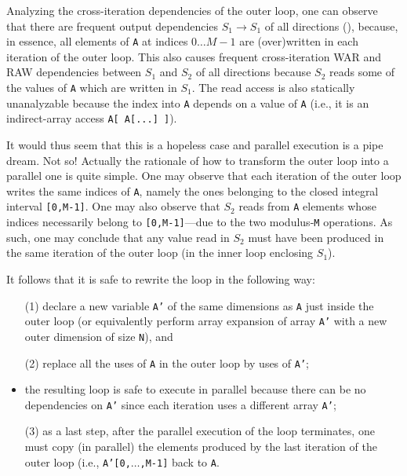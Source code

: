 \documentclass[acmsmall,review]{acmart}\settopmatter{printfolios=true,printccs=false,printacmref=false}
\begin{document}
Analyzing the cross-iteration dependencies of the outer loop,
one can observe that there are frequent output dependencies
$S_1\to S_1$ of all directions ({\tt *}), because, in 
essence, all elements of {\tt A} at indices $0\ldots M-1$
are (over)written in each iteration of the outer loop.
This also causes frequent cross-iteration WAR and RAW 
dependencies between $S_1$ and $S_2$ of all directions
{\tt *} because $S_2$ reads some of the values of 
{\tt A} which are written in $S_1$. The read access
is also statically unanalyzable because the index
into {\tt A} depends on a value of {\tt A} (i.e., 
it is an indirect-array access {\tt A[ A[...] ]}).  

It would thus seem that this is a hopeless case and parallel
execution is a pipe dream. Not so! Actually the rationale
of how to transform the outer loop into a parallel one
is quite simple.  One may observe that each iteration of
the outer loop writes the same indices of {\tt A}, namely
the ones belonging to the closed integral interval 
{\tt [0,M-1]}.   One may also observe that $S_2$ reads 
from {\tt A} elements whose indices necessarily belong to 
{\tt [0,M-1]}---due to the two modulus-{\tt M} operations. 
As such, one may conclude that any value
read in $S_2$ must have been produced in the same iteration
of the outer loop (in the inner loop enclosing $S_1$).

It follows that it is safe to rewrite the loop in the
following way:
\begin{itemize}
    \item[(1)] declare a new variable {\tt A'} of the same dimensions 
        as {\tt A} just inside the outer loop (or equivalently 
        perform array expansion of array {\tt A'} with a new outer
        dimension of size {\tt N}), and
    \item[(2)] replace all the uses of {\tt A} in the outer loop by
        uses of {\tt A'};
    \item the resulting loop is safe to execute in parallel
        because there can be no dependencies on {\tt A'} since
        each iteration uses a different array {\tt A'};
    \item[(3)] as a last step, after the parallel execution of
        the loop terminates, one must copy (in parallel)
        the elements produced by the last iteration of 
        the outer loop (i.e., {\tt A'[0,$\ldots$,M-1]} 
        back to {\tt A}.
\end{itemize}
\end{document}
